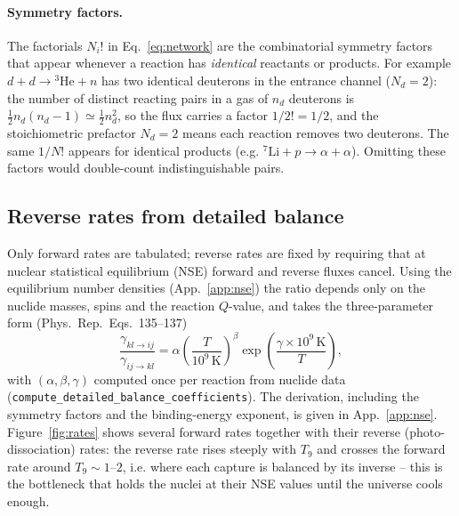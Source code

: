 \documentclass[11pt,a4paper]{article}
\newcommand{\PR}{Phys.\ Rep.}
\begin{document}
\paragraph{Symmetry factors.}
The factorials $N_i!$ in Eq.~\eqref{eq:network} are the combinatorial symmetry
factors that appear whenever a reaction has \emph{identical} reactants or
products. For example $d+d\to {}^3\mathrm{He}+n$ has two identical deuterons in
the entrance channel ($N_d=2$): the number of distinct reacting pairs in a gas
of $n_d$ deuterons is $\tfrac12 n_d(n_d-1)\simeq\tfrac12 n_d^2$, so the flux
carries a factor $1/2!=1/2$, and the stoichiometric prefactor $N_d=2$ means each
reaction removes two deuterons. The same $1/N!$ appears for identical products
(e.g. $^7\mathrm{Li}+p\to\alpha+\alpha$). Omitting these factors would
double-count indistinguishable pairs.

\subsection{Reverse rates from detailed balance}
Only forward rates are tabulated; reverse rates are fixed by requiring that at
nuclear statistical equilibrium (NSE) forward and reverse fluxes cancel. Using
the equilibrium number densities (App.~\ref{app:nse}) the ratio depends only on
the nuclide masses, spins and the reaction $Q$-value, and takes the
three-parameter form (\PR\ Eqs.~135--137)
\begin{equation}
  \frac{\gamma_{kl\to ij}}{\gamma_{ij\to kl}}
    = \alpha\left(\frac{T}{10^9\,\mathrm K}\right)^{\!\beta}
      \exp\!\left(\frac{\gamma\times10^9\,\mathrm K}{T}\right),
\label{eq:detbal}
\end{equation}
with $(\alpha,\beta,\gamma)$ computed once per reaction from nuclide data
(\texttt{compute\_detailed\_\allowbreak balance\_coefficients}). The derivation, including the
symmetry factors and the binding-energy exponent, is given in
App.~\ref{app:nse}. Figure~\ref{fig:rates} shows several forward rates together
with their reverse (photo-dissociation) rates: the reverse rate rises steeply
with $T_9$ and crosses the forward rate around $T_9\sim1$--$2$, i.e. where each
capture is balanced by its inverse -- this is the bottleneck that holds the
nuclei at their NSE values until the universe cools enough.
\end{document}
